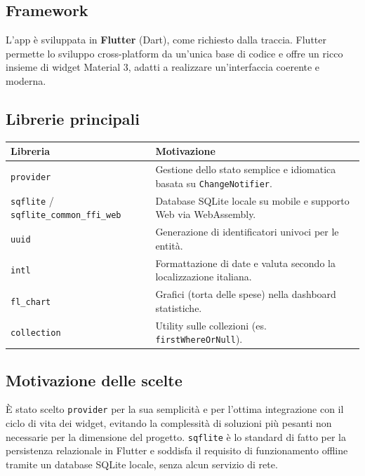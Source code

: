 \documentclass[11pt, a4paper]{article}
\begin{document}
\subsection{Framework}
L'app è sviluppata in \textbf{Flutter} (Dart), come richiesto dalla traccia. Flutter
permette lo sviluppo cross-platform da un'unica base di codice e offre un ricco insieme
di widget Material 3, adatti a realizzare un'interfaccia coerente e moderna.

\subsection{Librerie principali}
\begin{table}[h!]
    \centering
    \renewcommand{\arraystretch}{1.3}
    \begin{tabularx}{\textwidth}{l X}
        \toprule
        \textbf{Libreria} & \textbf{Motivazione} \\
        \midrule
        \texttt{provider} & Gestione dello stato semplice e idiomatica basata su \texttt{ChangeNotifier}. \\
        \texttt{sqflite} / \texttt{sqflite\_common\_ffi\_web} & Database SQLite locale su mobile e supporto Web via WebAssembly. \\
        \texttt{uuid} & Generazione di identificatori univoci per le entità. \\
        \texttt{intl} & Formattazione di date e valuta secondo la localizzazione italiana. \\
        \texttt{fl\_chart} & Grafici (torta delle spese) nella dashboard statistiche. \\
        \texttt{collection} & Utility sulle collezioni (es. \texttt{firstWhereOrNull}). \\
        \bottomrule
    \end{tabularx}
\end{table}

\subsection{Motivazione delle scelte}
È stato scelto \texttt{provider} per la sua semplicità e per l'ottima integrazione con il
ciclo di vita dei widget, evitando la complessità di soluzioni più pesanti non
necessarie per la dimensione del progetto. \texttt{sqflite} è lo standard di fatto per la
persistenza relazionale in Flutter e soddisfa il requisito di funzionamento offline
tramite un database SQLite locale, senza alcun servizio di rete.
\end{document}

